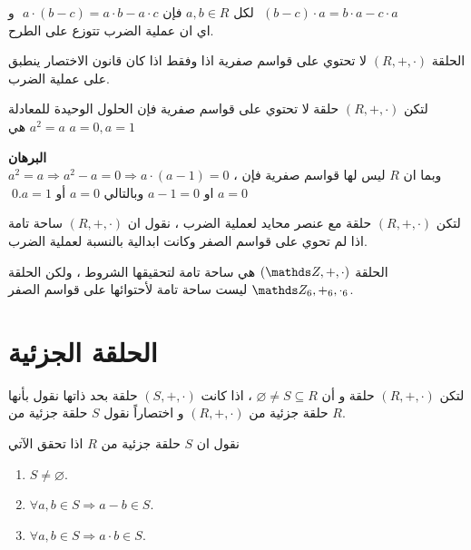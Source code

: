 \begin{corollary}
	لكل $a,b\in R$ فإن
	 $a\cdot (b-c) = a\cdot b - a\cdot c$\,\,  و \,\,$(b-c) \cdot a = b\cdot a - c\cdot a$\\
	 اي ان عملية الضرب تتوزع على الطرح.
\end{corollary}

\begin{theorem}
	الحلقة $(R, +, \cdot)$ لا تحتوي على قواسم صفرية اذا وفقط اذا كان قانون الاختصار ينطبق على عملية الضرب.
\end{theorem}

\begin{corollary}
	لتكن $(R, +, \cdot)$ حلقة لا تحتوي على قواسم صفرية فإن الحلول الوحيدة للمعادلة $a^2=a$ هي  $a=0, a=1$ 
\end{corollary}
\noindent
\textbf{البرهان}\\
\noindent
$a^2 =a\Rightarrow a^2-a=0\Rightarrow a\cdot(a-1)=0 $ ، وبما ان $R$ ليس لها قواسم صفرية فإن $a=0$ او $a-1=0$ وبالتالي $a=0 $ أو $a=1$.\qed

\begin{definition}
	لتكن $(R, +, \cdot)$ حلقة مع عنصر محايد لعملية الضرب ، نقول ان $(R, +, \cdot)$ ساحة تامة اذا لم تحوي على قواسم الصفر وكانت ابدالية بالنسبة لعملية الضرب.
\end{definition}

\begin{example}
	الحلقة $(\Z, +, \cdot)$ هي ساحة تامة لتحقيقها الشروط ، ولكن الحلقة 
	$\Z_6, +_6, \cdot_6$ ليست ساحة تامة لأحتوائها على قواسم الصفر.
\end{example}
\newpage
\section{الحلقة الجزئية}

\begin{definition}
	لتكن $(R, +, \cdot)$ حلقة و أن $\varnothing\neq S\subseteq R$ ، اذا كانت $(S, +, \cdot)$ حلقة بحد ذاتها نقول بأنها حلقة جزئية من $(R, +, \cdot)$ و اختصاراً نقول $S$ حلقة جزئية من $R$.
\end{definition}

\begin{note}
	نقول ان $S$ حلقة جزئية من $R$ اذا تحقق الآتي
	\begin{enumerate}[label=$\boxed{\arabic*}$]
		\item $S\neq \varnothing$.
		\item $\forall a,b\in S \Rightarrow a-b\in S$.
		\item $\forall a,b\in S\Rightarrow a\cdot b\in S$.
	\end{enumerate}
\end{note}

